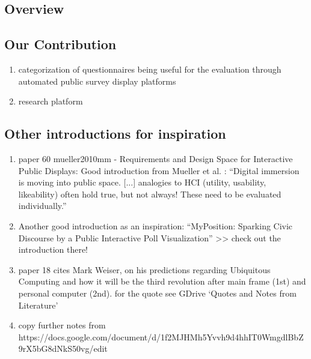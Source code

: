 	\subsection{Overview}



	\subsection{Our Contribution}

	\begin{enumerate}
	\item categorization of questionnaires being useful for the evaluation through automated public survey display platforms
	\item research platform

	\end{enumerate}








	\subsection{Other introductions for inspiration}

	\begin{enumerate}
	\item paper 60 mueller2010mm - Requirements and Design Space for  Interactive Public Displays: Good introduction from Mueller et al. \cite{muller2010requirements}: ``Digital immersion is moving into public space. [...] analogies to HCI (utility, usability, likeability) often hold true, but not always! These need to be evaluated individually.''

	\item Another good introduction as an inspiration: ``MyPosition: Sparking Civic Discourse by a Public Interactive Poll Visualization'' >> check out the introduction there! \cite{valkanova2014myposition}

	\item paper 18 cites Mark Weiser, on his predictions regarding Ubiquitous Computing and how it will be the third revolution after main frame (1st) and personal computer (2nd). for the quote see GDrive `Quotes and Notes from Literature'

	\item copy further notes from https://docs.google.com/document/d/1f2MJHMh5Yvvh9d4hhIT0WmgdlBbZ9rX5bG8dNkS50vg/edit
	\end{enumerate}



